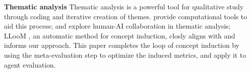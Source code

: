 \documentclass[../main.tex]{subfiles}
\begin{document}
\noindent\textbf{Thematic analysis}
Thematic analysis is a powerful tool for qualitative study through coding and
iterative creation of themes. \citet{gauthier2022computational} provide
computational tools to aid this process; \citet{hong2022scholastic} and \citet{gebreegziabher2023patat}
explore human-AI collaboration in thematic analysis; LLooM \citep{lam2024concept},
an automatic method for concept induction, closly aligns with and informs our approach.
This paper completes the loop of concept induction by using the meta-evaluation
step to optimize the induced metrics, and apply it to
agent evaluation.
\end{document}

